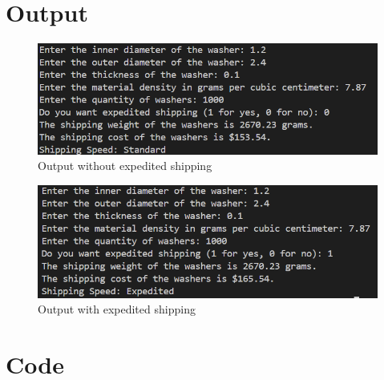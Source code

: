 \documentclass{article}
\begin{document}
\begin{flushleft}
	\section{Output}
	\begin{figure}[!h]
		\begin{centering}
			\includegraphics[width=\linewidth]{Lab_2_output_1.png}
			\caption{Output without expedited shipping}
		\end{centering}
	\end{figure}
	\begin{figure}[!h]
		\begin{centering}
			\includegraphics[width=\linewidth]{Lab_2_output_2.png}
			\caption{Output with expedited shipping}
		\end{centering}
	\end{figure}
	\section{Code}
	
\end{flushleft}
\end{document}

